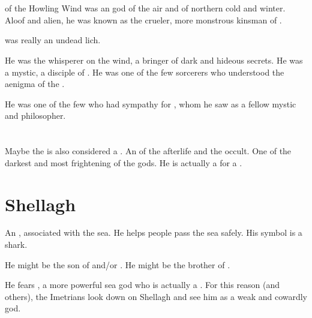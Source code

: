 \section{\Llorgul}
\index{\Llorgul}
\Llorgul of the Howling Wind was an \Ortaican god of the air and of northern cold and winter. 
Aloof and alien, he was known as the crueler, more monstrous kinsman of \Daxian.

\Llorgul was really an undead \ophidian lich.

He was the whisperer on the wind, a bringer of dark and hideous secrets. 
He was a mystic, a disciple of \Sethicus. 
He was one of the few sorcerers who understood the aenigma of the . 

He was one of the few who had sympathy for , whom he saw as a fellow mystic and philosopher.















\section{\NerrhanKoss}
\index{\NerrhanKoss}
Maybe  the \xs{} is also considered a . 
An  of the afterlife and the occult. 
One of the darkest and most frightening of the \Ortaican{} gods. 
He is actually a  for a \xs. 















\section{Shellagh}
An , associated with the sea. 
He helps people pass the sea safely. 
His symbol is a shark. 

He might be the son of  and/or .
He might be the brother of . 

He fears , a more powerful sea god who is actually a \nagalord. 
For this reason (and others), the Imetrians look down on Shellagh and see him as a weak and cowardly god. 





























